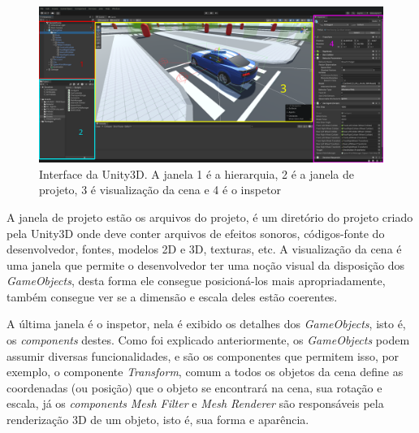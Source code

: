 \begin{figure}[h]
   \centering
   \includegraphics[scale=0.2]{figs/interface-unity3d-indicadores.png}
    \caption{Interface da Unity3D. A janela 1 é a hierarquia, 2 é a janela de projeto, 3 é visualização da cena e 4 é o inspetor}
    \label{fig:unity-ui}
 \end{figure}

A janela de projeto estão os arquivos do projeto, é um diretório do projeto criado pela Unity3D onde deve conter arquivos de efeitos sonoros, códigos-fonte do desenvolvedor, fontes, modelos 2D e 3D, texturas, etc. A visualização da cena é uma janela que permite o desenvolvedor ter uma noção visual da disposição dos \textit{GameObjects}, desta forma ele consegue posicioná-los mais apropriadamente, também consegue ver se a dimensão e escala deles estão coerentes. 

A última janela é o inspetor, nela é exibido os detalhes dos \textit{GameObjects}, isto é, os \textit{components} destes. Como foi explicado anteriormente, os \textit{GameObjects} podem assumir diversas funcionalidades, e são os componentes que permitem isso, por exemplo, o componente \textit{Transform}, comum a todos os objetos da cena define as coordenadas (ou posição) que o objeto se encontrará na cena, sua rotação e escala, já os \textit{components} \textit{Mesh Filter} e \textit{Mesh Renderer} são responsáveis pela renderização 3D de um objeto, isto é, sua forma e aparência.



